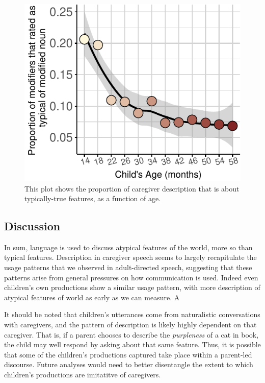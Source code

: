 \documentclass[10pt, letterpaper]{article}
\newenvironment{CodeChunk}{}{}
\begin{document}
\begin{CodeChunk}
\begin{figure}[tb]

{\centering \includegraphics{figs/prototypical_plot-1} 

}

\caption[This plot shows the proportion of caregiver description that is about typically-true features, as a function of age]{This plot shows the proportion of caregiver description that is about typically-true features, as a function of age.}\label{fig:prototypical_plot}
\end{figure}
\end{CodeChunk}

\hypertarget{discussion}{%
\subsection{Discussion}\label{discussion}}

In sum, language is used to discuss atypical features of the world, more
so than typical features. Description in caregiver speech seems to
largely recapitulate the usage patterns that we observed in
adult-directed speech, suggesting that these patterns arise from general
pressures on how communication is used. Indeed even children's own
productions show a similar usage pattern, with more description of
atypical features of world as early as we can measure. A

It should be noted that children's utterances come from naturalistic
conversations with caregivers, and the pattern of description is likely
highly dependent on that caregiver. That is, if a parent chooses to
describe the \emph{purpleness} of a cat in book, the child may well
respond by asking about that same feature. Thus, it is possible that
some of the children's productions captured take place within a
parent-led discourse. Future analyses would need to better disentangle
the extent to which children's productions are imitatitve of caregivers.
\end{document}
